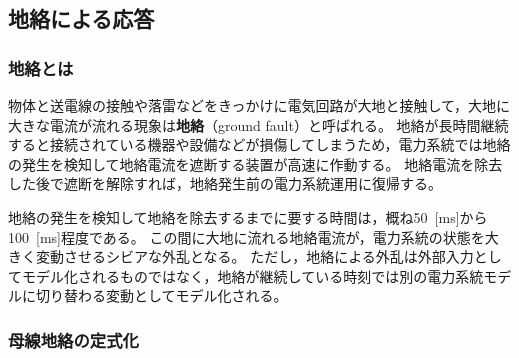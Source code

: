 \documentclass[tombow,dvipdfmx]{corona-a5-1.1}
\begin{document}
\subsection{地絡による応答}

\smallskip
\subsubsection{地絡とは}

物体と送電線の接触や落雷などをきっかけに電気回路が大地と接触して，大地に大きな電流が流れる現象は\textbf{地絡}（ground fault）と呼ばれる。
地絡が長時間継続すると接続されている機器や設備などが損傷してしまうため，電力系統では地絡の発生を検知して地絡電流を遮断する装置が高速に作動する。
地絡電流を除去した後で遮断を解除すれば，地絡発生前の電力系統運用に復帰する。

地絡の発生を検知して地絡を除去するまでに要する時間は，概ね50~[ms]から100~[ms]程度である。
この間に大地に流れる地絡電流が，電力系統の状態を大きく変動させるシビアな外乱となる。
ただし，地絡による外乱は外部入力としてモデル化されるものではなく，地絡が継続している時刻では別の電力系統モデルに切り替わる変動としてモデル化される。

\smallskip
\subsubsection{母線地絡の定式化}
\end{document}
